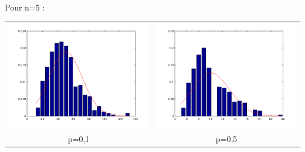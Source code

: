 \documentclass{article}
\begin{document}
Pour n=5 : \\
\begin{tabular}{c c}
	\includegraphics[scale=0.5]{graph/n5p1.png} & 
	\includegraphics[scale=0.5]{graph/n5p5.png} \\
	p=0,1 &	p=0,5
\end{tabular}\\
\end{document}
